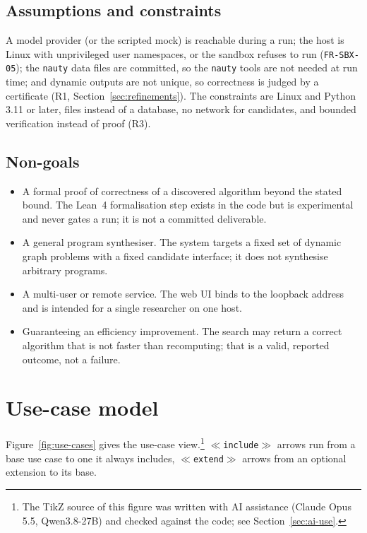 \subsection{Assumptions and constraints}

A model provider (or the scripted mock) is reachable during a run; the host is
Linux with unprivileged user namespaces, or the sandbox refuses to run
(\texttt{FR-SBX-05}); the \texttt{nauty} data files are committed, so the
\texttt{nauty} tools are not needed at run time; and dynamic outputs are not
unique, so correctness is judged by a certificate (R1,
Section~\ref{sec:refinements}). The constraints are Linux and Python 3.11 or
later, files instead of a database, no network for candidates, and bounded
verification instead of proof (R3).

\subsection{Non-goals}

\begin{itemize}
  \item A formal proof of correctness of a discovered algorithm beyond the
  stated bound. The Lean~4 formalisation step exists in the code but is
  experimental and never gates a run; it is not a committed deliverable.
  \item A general program synthesiser. The system targets a fixed set of
  dynamic graph problems with a fixed candidate interface; it does not
  synthesise arbitrary programs.
  \item A multi-user or remote service. The web UI binds to the loopback
  address and is intended for a single researcher on one host.
  \item Guaranteeing an efficiency improvement. The search may return a
  correct algorithm that is not faster than recomputing; that is a valid,
  reported outcome, not a failure.
\end{itemize}

\section{Use-case model}
\label{sec:usecases}

Figure~\ref{fig:use-cases} gives the use-case view.\footnote{The TikZ source of this figure was written with AI assistance (Claude Opus 5.5, Qwen3.8-27B) and checked against the code; see Section~\ref{sec:ai-use}.} \texttt{$\ll$include$\gg$}
arrows run from a base use case to one it always includes,
\texttt{$\ll$extend$\gg$} arrows from an optional extension to its base.

